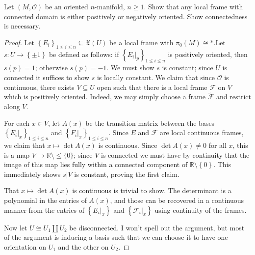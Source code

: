 \begin{exercise}\label{4.2.2}
	Let $(M,\mathcal{O} )$ be an oriented $n$-manifold, $n\geq 1$. Show that any local frame with connected domain is either positively or negatively oriented. Show connectedness is necessary.
\end{exercise}
\begin{proof}
	Let $\left\{ E_i \right\}_{1\leq i\leq n} \subseteq \mathfrak{X}(U)$ be a local frame with $\pi_0(M)\cong *$.Let $s : U \to \left\{ \pm1 \right\} $ be defined as follows: if $\left\{ E_i|_p \right\}_{1\leq i\leq n} $ is positively oriented, then $s(p)=1$; otherwise $s(p)=-1$. We must show $s$ is constant; since $U$ is connected it suffices to show $s$ is locally constant. We claim that since $\mathcal{O} $ is continuous, there exists $V\subseteq U$ open such that there is a local frame $\mathcal{F} $ on $V$ which is positively oriented. Indeed, we may simply choose a frame $\widetilde{\mathcal{F} } $ and restrict along $V$.

	For each $x\in V$, let $A(x)$ be the transition matrix between the bases $\left\{ E_i|_x \right\} _{1\leq i\leq n}$ and $\left\{ F_i|_x \right\} _{1\leq i\leq n} $. Since $E$ and $\mathcal{F} $ are local continuous frames, we claim that $x\mapsto \det A(x)$ is continuous. Since $\det A(x)\neq 0$ for all $x$, this is a map $V\to \mathbb{R} \setminus \leq \{0\}$; since $V$ is connected we must have by continuity that the image of this map lies fully within a connected component of $\mathbb{R} \setminus \left\{ 0 \right\} $. This immediately shows $s|V$ is constant, proving the first claim.

	That $x\mapsto \det A(x)$ is continuous is trivial to show. The determinant is a polynomial in the entries of $A(x)$, and those can be recovered in a continuous manner from the entries of $\left\{ E_i|_x \right\} $ and $\left\{ \mathcal{F} _i|_x \right\} $ using continuity of the frames.

	Now let $U\cong U_1 \amalg U_2$ be disconnected. I won't spell out the argument, but most of the argument is inducing a basis such that we can choose it to have one orientation on $U_1$ and the other on $U_2$.
\end{proof}

